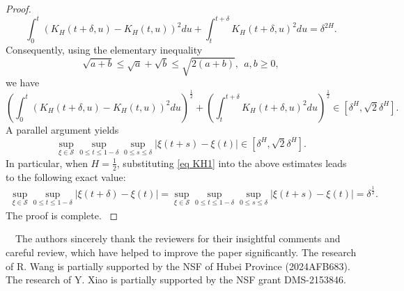 \documentclass[11pt, reqno]{amsart}
\numberwithin{equation}{section}
\newcommand{\1}{{\bf 1}}
\newcommand{\2}{{\bf 2}}
\begin{document}
\begin{proof}
{$$ \int_0^{t}\left( K_H(t+\delta, u)-K_H(t, u)\right)^2 du +  \int_{t}^{t+\delta} K_H(t+\delta, u) ^2 du=\delta^{2H}.
 $$
 Consequently, using the elementary inequality
  $$ \sqrt{a+b}\le \sqrt{a}+\sqrt{b}\le \sqrt{2(a+b)}, \ \  a, b\ge0, $$
 we have
 $$
\left(\int_0^{t}\left( K_H(t+\delta, u)-K_H(t, u)\right)^2 du\right)^{\frac12}+  \left(\int_{t}^{t+\delta} K_H(t+\delta, u) ^2 du\right)^{\frac12} \in \left[\delta^H, \sqrt{2}\delta^H\right].
 $$
 A parallel argument yields
  $$
   \sup_{\xi \in \mathscr S}\sup_{0\le t\le 1-\delta}\sup_{0\le s\le \delta}|\xi(t+s)-\xi(t)| \in  \left[\delta^H, \sqrt{2}\delta^H\right].
  $$
  In particular,   when $H=\frac12$,   substituting \eqref{eq KH1} into the above estimates leads to the following  exact value:
  \begin{align*}
\sup_{\xi \in \mathscr S}\sup_{0\le t\le 1-\delta}|\xi(t+\delta)-\xi(t)|   = \sup_{\xi \in \mathscr S}\sup_{0\le t\le 1-\delta}\sup_{0\le s\le \delta}|\xi(t+s)-\xi(t)| = \delta^{\frac12}.
\end{align*}
 }
  {The proof is complete. }
 \end{proof}
 
\vskip0.5cm 
 

  \ \   {The authors sincerely thank the reviewers for their insightful comments and careful review, 
which have helped to improve the paper significantly.} The research of R. Wang is partially supported by the NSF of Hubei Province (2024AFB683). 
The research of Y. Xiao is partially supported by the NSF grant DMS-2153846.
\end{document}
